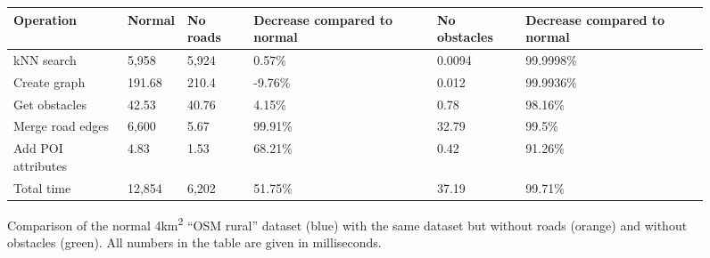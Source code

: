 			\begin{figure}[h!]
				\begin{tabularx}{0.95\textwidth}{p{3cm}XXXp{2.25cm}X}
\toprule
\textbf{Operation}	& \textbf{Normal}	& \textbf{No roads}	& \textbf{Decrease compared to normal}	& \textbf{No obstacles}	& \textbf{Decrease compared to normal}	\\
\midrule
kNN search			&  5,958			& 5,924				&   0.57\%								&  0.0094				& 99.9998\%								\\
Create graph		&    191.68			&   210.4			&  -9.76\%								&  0.012				& 99.9936\%								\\
Get obstacles		&     42.53			&    40.76			&   4.15\%								&  0.78					& 98.16\%								\\
Merge road edges	&  6,600			&     5.67			&  99.91\%								& 32.79					& 99.5\%								\\
Add POI attributes	&      4.83			&     1.53			&  68.21\%								&  0.42					& 91.26\%								\\
\midrule
Total time			& 12,854			& 6,202				&  51.75\%								& 37.19					& 99.71\%								\\
\bottomrule
				\end{tabularx}
				\vspace{3ex}
				\begin{figcenter}
					
				\end{figcenter}
				\caption{Comparison of the normal 4km\textsuperscript{2} \enquote{OSM rural} dataset (blue) with the same dataset but without roads (orange) and without obstacles (green). All numbers in the table are given in milliseconds.}
				\label{fig:eval-import-osm-no-roads-obstacles-rural}
			\end{figure}
			
